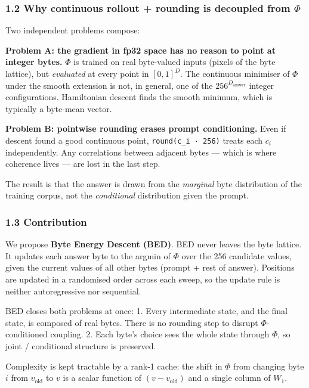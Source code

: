 \documentclass[
  11pt,
  a4paper,
]{article}
\begin{document}
\subsubsection{\texorpdfstring{1.2 Why continuous rollout + rounding is
decoupled from
\(\Phi\)}{1.2 Why continuous rollout + rounding is decoupled from \textbackslash Phi}}\label{why-continuous-rollout-rounding-is-decoupled-from-phi}

Two independent problems compose:

\textbf{Problem A: the gradient in fp32 space has no reason to point at
integer bytes.} \(\Phi\) is trained on real byte-valued inputs (pixels
of the byte lattice), but \emph{evaluated} at every point in
\([0,1]^D\). The continuous minimiser of \(\Phi\) under the smooth
extension is not, in general, one of the \(256^{D_{\text{answer}}}\)
integer configurations. Hamiltonian descent finds the smooth minimum,
which is typically a byte-mean vector.

\textbf{Problem B: pointwise rounding erases prompt conditioning.} Even
if descent found a good continuous point, \texttt{round(c\_i\ ·\ 256)}
treats each \(c_i\) independently. Any correlations between adjacent
bytes --- which is where coherence lives --- are lost in the last step.

The result is that the answer is drawn from the \emph{marginal} byte
distribution of the training corpus, not the \emph{conditional}
distribution given the prompt.

\subsubsection{1.3 Contribution}\label{contribution}

We propose \textbf{Byte Energy Descent (BED)}. BED never leaves the byte
lattice. It updates each answer byte to the argmin of \(\Phi\) over the
256 candidate values, given the current values of all other bytes
(prompt + rest of answer). Positions are updated in a randomised order
across each sweep, so the update rule is neither autoregressive nor
sequential.

BED closes both problems at once: 1. Every intermediate state, and the
final state, is composed of real bytes. There is no rounding step to
disrupt \(\Phi\)-conditioned coupling. 2. Each byte's choice sees the
whole state through \(\Phi\), so joint / conditional structure is
preserved.

Complexity is kept tractable by a rank-1 cache: the shift in \(\Phi\)
from changing byte \(i\) from \(v_{\text{old}}\) to \(v\) is a scalar
function of \((v - v_{\text{old}})\) and a single column of \(W_1\).
\end{document}
